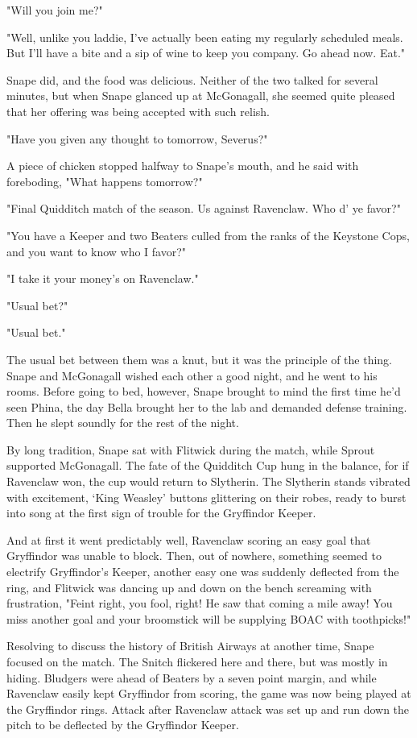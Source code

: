 "Will you join me?"

"Well, unlike you laddie, I've actually been eating my regularly scheduled meals. But I'll have a bite and a sip of wine to keep you company. Go ahead now. Eat."

Snape did, and the food was delicious. Neither of the two talked for several minutes, but when Snape glanced up at McGonagall, she seemed quite pleased that her offering was being accepted with such relish.

"Have you given any thought to tomorrow, Severus?"

A piece of chicken stopped halfway to Snape's mouth, and he said with foreboding, "What happens tomorrow?"

"Final Quidditch match of the season. Us against Ravenclaw. Who d' ye favor?"

"You have a Keeper and two Beaters culled from the ranks of the Keystone Cops, and you want to know who I favor?"

"I take it your money's on Ravenclaw."

"Usual bet?"

"Usual bet."

The usual bet between them was a knut, but it was the principle of the thing. Snape and McGonagall wished each other a good night, and he went to his rooms. Before going to bed, however, Snape brought to mind the first time he'd seen Phina, the day Bella brought her to the lab and demanded defense training. Then he slept soundly for the rest of the night.

By long tradition, Snape sat with Flitwick during the match, while Sprout supported McGonagall. The fate of the Quidditch Cup hung in the balance, for if Ravenclaw won, the cup would return to Slytherin. The Slytherin stands vibrated with excitement, `King Weasley' buttons glittering on their robes, ready to burst into song at the first sign of trouble for the Gryffindor Keeper.

And at first it went predictably well, Ravenclaw scoring an easy goal that Gryffindor was unable to block. Then, out of nowhere, something seemed to electrify Gryffindor's Keeper, another easy one was suddenly deflected from the ring, and Flitwick was dancing up and down on the bench screaming with frustration, "Feint right, you fool, right! He saw that coming a mile away! You miss another goal and your broomstick will be supplying BOAC with toothpicks!"

Resolving to discuss the history of British Airways at another time, Snape focused on the match. The Snitch flickered here and there, but was mostly in hiding. Bludgers were ahead of Beaters by a seven point margin, and while Ravenclaw easily kept Gryffindor from scoring, the game was now being played at the Gryffindor rings. Attack after Ravenclaw attack was set up and run down the pitch to be deflected by the Gryffindor Keeper.

